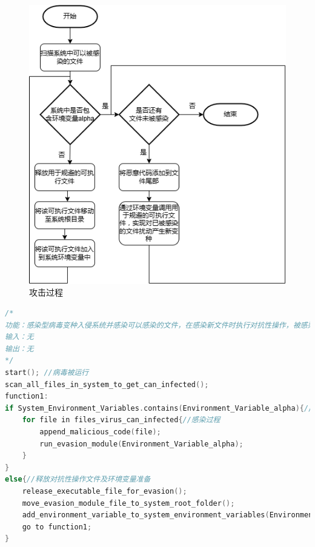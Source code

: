 \begin{figure}
  \centering
  \includegraphics[]{images/attack.png}
  \caption{攻击过程}\label{fig:attack}
\end{figure}

\begin{lstlisting}[language=C++, caption={}, label={lst:cppfile1}]
/*
功能：感染型病毒变种入侵系统并感染可以感染的文件，在感染新文件时执行对抗性操作，被感染的新文件会受到静态规避操作的修改。
输入：无
输出：无
*/
start(); //病毒被运行  
scan_all_files_in_system_to_get_can_infected();   
function1:  
if System_Environment_Variables.contains(Environment_Variable_alpha){//检测到环境变量  
    for file in files_virus_can_infected{//感染过程  
        append_malicious_code(file);  
        run_evasion_module(Environment_Variable_alpha);  
    }  
}  
else{//释放对抗性操作文件及环境变量准备  
    release_executable_file_for_evasion();  
    move_evasion_module_file_to_system_root_folder();  
    add_environment_variable_to_system_environment_variables(Environment_Variable_alpha);  
    go to function1;  
}  

\end{lstlisting}

